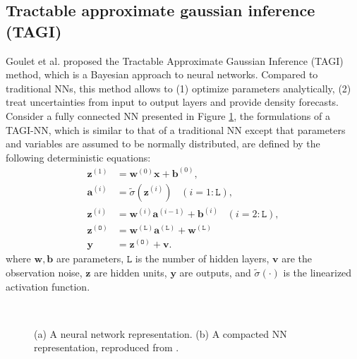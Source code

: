 \documentclass{article}
\begin{document}
\subsection{Tractable approximate gaussian inference (TAGI)}\label{sub:tagi}
Goulet et al. \cite{goulet2020tractable} proposed the Tractable Approximate Gaussian Inference (TAGI) method, which is a Bayesian approach to neural networks. Compared to traditional NNs, this method allows to (1) optimize parameters analytically, (2) treat uncertainties from input to output layers and provide density forecasts. \\
Consider a fully connected NN presented in Figure \ref{fig:FNN},
the formulations of a TAGI-NN, which is similar to that of a traditional NN except that parameters and variables are assumed to be normally distributed, are defined by the following deterministic equations:
\begin{equation*} \label{eq:TAGI}
\begin{split}
    \bm{z}^{(1)} &= \bm{w}^{(0)} \bm{x} + \bm{b}^{(0)}, \\
    \bm{a}^{(i)} &= \tilde{\sigma}(\bm{z}^{(i)}) \; \; \;(i=1:\mathtt{L}), \\
    \bm{z}^{(i)} &= \bm{w}^{(i)} \bm{a}^{(i-1)} + \bm{b}^{(i)} \; \; \;(i=2:\mathtt{L}), \\
    \bm{z}^{(\mathtt{O})} &=  \bm{w}^{(\mathtt{L})} \bm{a}^{(\mathtt{L})} + \bm{w}^{(\mathtt{L})} \\
    \bm{y} &=  \bm{z}^{(\mathtt{O})} + \bm{v}.
\end{split}
\end{equation*}
where $\bm{w},\bm{b}$ are parameters, $\mathtt{L}$ is the number of hidden layers, $\bm{v}$ are the observation noise, $\bm{z}$ are hidden units, $\bm{y}$ are outputs, and $\tilde{\sigma}(\cdot)$ is the linearized activation function.
\begin{figure}[htbp]
\centering
\subfigure[]{\resizebox{0.9\linewidth}{!}{}}\\
\subfigure[]{\resizebox{0.9
\linewidth}{!}{}}
\caption{(a) A neural network representation. (b) A compacted NN representation, reproduced from \cite{goulet2020tractable}.}
\label{fig:FNN}
\end{figure}
\end{document}

